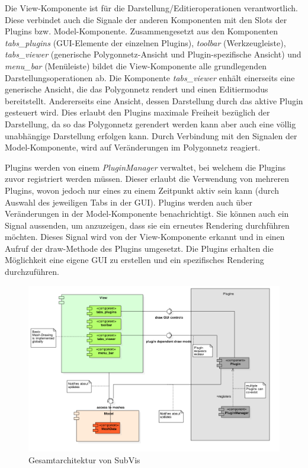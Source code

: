 Die View-Komponente ist für die Darstellung/Editieroperationen verantwortlich.
Diese verbindet auch die Signale der anderen Komponenten mit den Slots der Plugins bzw. Model-Komponente.
Zusammengesetzt aus den Komponenten \emph{tabs\_plugins} (GUI-Elemente der einzelnen Plugins), \emph{toolbar} (Werkzeugleiste), \emph{tabs\_viewer} (generische Polygonnetz-Ansicht und Plugin-spezifische Ansicht) und \emph{menu\_bar} (Menüleiste) bildet die View-Komponente alle grundlegenden Darstellungsoperationen ab.
Die Komponente \emph{tabs\_viewer} enhält einerseits eine generische Ansicht, die das Polygonnetz rendert und einen Editiermodus bereitstellt. 
Andererseits eine Ansicht, dessen Darstellung durch das aktive Plugin gesteuert wird.
Dies erlaubt den Plugins maximale Freiheit bezüglich der Darstellung, da so das Polygonnetz gerendert werden kann aber auch eine völlig unabhängige Darstellung erfolgen kann.
Durch Verbindung mit den Signalen der Model-Komponente, wird auf Veränderungen im Polygonnetz reagiert.

Plugins werden von einem \emph{PluginManager} verwaltet, bei welchem die Plugins zuvor registriert werden müssen.
Dieser erlaubt die Verwendung von mehreren Plugins, wovon jedoch nur eines zu einem Zeitpunkt aktiv sein kann (durch Auswahl des jeweiligen Tabs in der GUI).
Plugins werden auch über Veränderungen in der Model-Komponente benachrichtigt.
Sie können auch ein Signal aussenden, um anzuzeigen, dass sie ein erneutes Rendering durchführen möchten.
Dieses Signal wird von der View-Komponente erkannt und in einen Aufruf der draw-Methode des Plugins umgesetzt.
Die Plugins erhalten die Möglichkeit eine eigene GUI zu erstellen und ein spezifisches Rendering durchzuführen.

\begin{figure}
  \centering
  \includegraphics[width=\textwidth]{content/media/subvis_architektur.png}
  \caption{Gesamtarchitektur von SubVis}
  \label{fig:subvis_architektur}
\end{figure}



